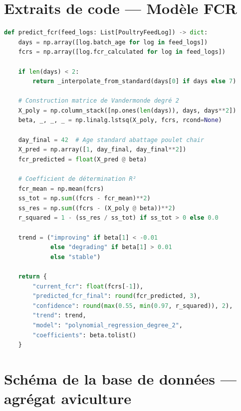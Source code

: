 \chapter{Extraits de code — Modèle FCR}
\label{ann:fcr_code}

\begin{lstlisting}[language=python, caption={Implémentation de la régression polynomiale FCR}]
def predict_fcr(feed_logs: List[PoultryFeedLog]) -> dict:
    days = np.array([log.batch_age for log in feed_logs])
    fcrs = np.array([log.fcr_calculated for log in feed_logs])

    if len(days) < 2:
        return _interpolate_from_standard(days[0] if days else 7)

    # Construction matrice de Vandermonde degré 2
    X_poly = np.column_stack([np.ones(len(days)), days, days**2])
    beta, _, _, _ = np.linalg.lstsq(X_poly, fcrs, rcond=None)

    day_final = 42  # Age standard abattage poulet chair
    X_pred = np.array([1, day_final, day_final**2])
    fcr_predicted = float(X_pred @ beta)

    # Coefficient de détermination R²
    fcr_mean = np.mean(fcrs)
    ss_tot = np.sum((fcrs - fcr_mean)**2)
    ss_res = np.sum((fcrs - (X_poly @ beta))**2)
    r_squared = 1 - (ss_res / ss_tot) if ss_tot > 0 else 0.0

    trend = ("improving" if beta[1] < -0.01
             else "degrading" if beta[1] > 0.01
             else "stable")

    return {
        "current_fcr": float(fcrs[-1]),
        "predicted_fcr_final": round(fcr_predicted, 3),
        "confidence": round(max(0.55, min(0.97, r_squared)), 2),
        "trend": trend,
        "model": "polynomial_regression_degree_2",
        "coefficients": beta.tolist()
    }
\end{lstlisting}

\chapter{Schéma de la base de données — agrégat aviculture}
\label{ann:schema_poultry}

